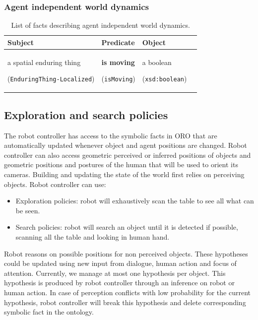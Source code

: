 \documentclass{svmult}
\newcommand{\concept}[1]{{\footnotesize \texttt{#1}}}
\begin{document}
\subsubsection{Agent independent world dynamics}
\begin{table}[h]
   \centering
   \begin{tabular}{p{2cm}p{5cm}p{2cm}l}
	\rowcolor{white}

	\textbf{Subject} & \textbf{Predicate} & \textbf{Object} \\ 
	\hline
	 a spatial enduring thing \par (\concept{EnduringThing-Localized})  & \textbf{is moving} \par (\concept{isMoving})  &  a boolean \par (\concept{xsd:boolean})  
	\end{tabular}
   \caption{List of facts describing agent independent world dynamics.}
\end{table}


\subsection{Exploration and search policies}

The robot controller has access to the symbolic facts in ORO that are
automatically updated whenever object and agent positions are changed.
Robot controller can also access geometric perceived or inferred
positions of objects and geometric positions and postures of the human
that will be used to orient its cameras.  Building and updating the
state of the world first relies on perceiving objects. Robot
controller can use:

\begin {itemize}
\item Exploration policies: robot will exhaustively scan the table to
  see all what can be seen.

\item Search policies: robot will search an object until it is
  detected if possible, scanning all the table and looking in human
  hand.

\end {itemize}

Robot reasons on possible positions for non perceived
objects. These hypotheses could be updated using new input from dialogue, human
action and focus of attention. Currently, we manage at most one hypothesis per
object. This hypothesis is produced by robot controller through an inference on
robot or human action. In case of perception conflicts with low probability for
the current hypothesis, robot controller will break this hypothesis and delete
corresponding symbolic fact in the ontology.
\end{document}
